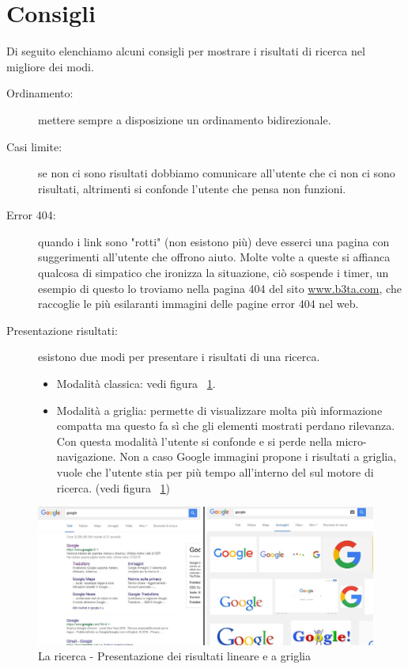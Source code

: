 	\section{Consigli}
		Di seguito elenchiamo alcuni consigli per mostrare i risultati di ricerca nel migliore dei modi.
		\begin{description}
			\item[Ordinamento:] mettere sempre a disposizione un ordinamento bidirezionale.
			\item[Casi limite:] se non ci sono risultati dobbiamo comunicare all'utente che ci non ci sono risultati, altrimenti si confonde l'utente che pensa non funzioni.
			\item[Error 404:] \label{sec:error404} quando i link sono "rotti" (non esistono più) deve esserci una pagina con suggerimenti all'utente che offrono aiuto. Molte volte a queste si affianca qualcosa di simpatico che ironizza la situazione, ciò sospende i timer, un esempio di questo lo troviamo nella pagina 404 del sito \href{http://www.b3ta.com/error404}{www.b3ta.com}, che raccoglie le più esilaranti immagini delle pagine error 404 nel web.
			\item[Presentazione risultati:] esistono due modi per presentare i risultati di una ricerca.
				\begin{itemize}
					\item Modalità classica: vedi figura ~\ref{fig:LaRicerca-Consigli}.
					\item Modalità a griglia: permette di visualizzare molta più informazione compatta ma questo fa sì che gli elementi mostrati perdano rilevanza. Con questa modalità l'utente si confonde e si perde nella micro-navigazione. Non a caso Google immagini propone i risultati a griglia, vuole che l'utente stia per più tempo all'interno del sul motore di ricerca. (vedi figura ~\ref{fig:LaRicerca-Consigli})
				\end{itemize}
		\end{description}
		
		\begin{figure}
			\centering
			\includegraphics[width=\textwidth]{images/LaRicerca-Consigli}
			\caption[La ricerca - Tipi di presentazioni risultati]{La ricerca - Presentazione dei risultati lineare e a griglia}
			\label{fig:LaRicerca-Consigli}
		\end{figure}
		
